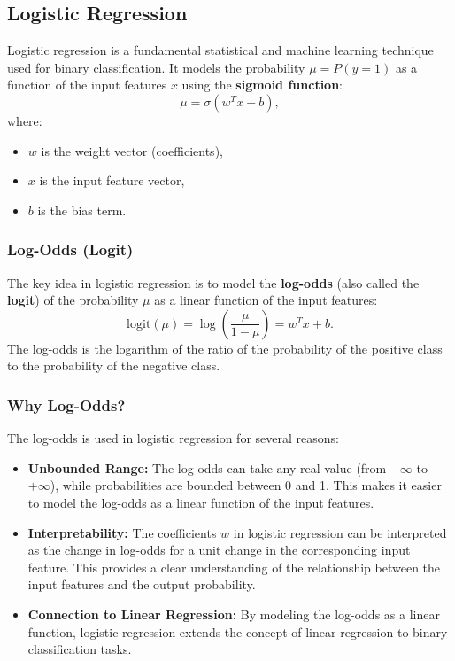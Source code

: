 \begin{notechapter}
\subsection{Logistic Regression}
Logistic regression is a fundamental statistical and machine learning technique used for binary classification. It models the probability \( \mu = P(y = 1) \) as a function of the input features \( x \) using the \textbf{sigmoid function}:
\[
\mu = \sigma(w^T x + b),
\]
where:
\begin{itemize}
    \item \( w \) is the weight vector (coefficients),
    \item \( x \) is the input feature vector,
    \item \( b \) is the bias term.
\end{itemize}

\subsubsection{Log-Odds (Logit)}
The key idea in logistic regression is to model the \textbf{log-odds} (also called the \textbf{logit}) of the probability \( \mu \) as a linear function of the input features:
\[
\text{logit}(\mu) = \log \left( \frac{\mu}{1 - \mu} \right) = w^T x + b.
\]
The log-odds is the logarithm of the ratio of the probability of the positive class to the probability of the negative class.

\subsubsection{Why Log-Odds?}
The log-odds is used in logistic regression for several reasons:
\begin{itemize}
    \item \textbf{Unbounded Range:} The log-odds can take any real value (from \(-\infty\) to \(+\infty\)), while probabilities are bounded between 0 and 1. This makes it easier to model the log-odds as a linear function of the input features.
    \item \textbf{Interpretability:} The coefficients \( w \) in logistic regression can be interpreted as the change in log-odds for a unit change in the corresponding input feature. This provides a clear understanding of the relationship between the input features and the output probability.
    \item \textbf{Connection to Linear Regression:} By modeling the log-odds as a linear function, logistic regression extends the concept of linear regression to binary classification tasks.
\end{itemize}


\end{notechapter}
